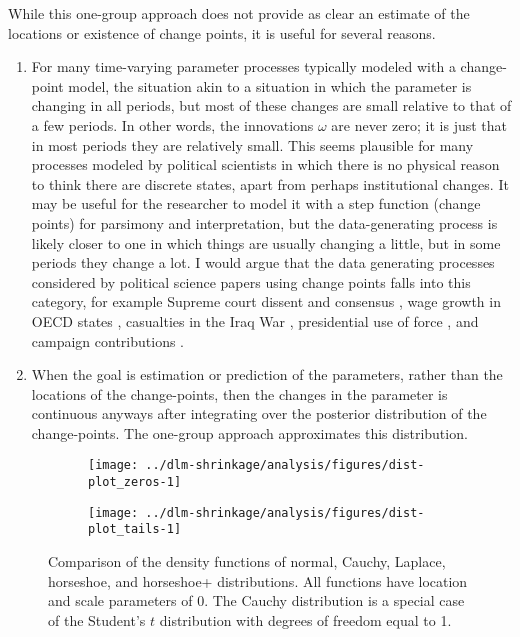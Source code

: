 While this one-group approach does not provide as clear an estimate of the locations or existence of change points, it is useful for several reasons.
\begin{enumerate}
\item For many time-varying parameter processes typically modeled with a change-point model, the situation akin to a situation in which the parameter is changing in all periods, but most of these changes are small relative to that of a few periods.
  In other words, the innovations $\omega$ are never zero; it is just that in most periods they are relatively small.
  This seems plausible for many processes modeled by political scientists in which there is no physical reason to think there are discrete states, apart from perhaps institutional changes.
  It may be useful for the researcher to model it with a step function (change points) for parsimony and interpretation, but the data-generating process is likely closer to one in which things are usually changing a little, but in some periods they change a lot. 
  I would argue that the data generating processes considered by political science papers using change points falls into this category, for example Supreme court dissent and consensus \parencite{CalderiaZorn1998}, wage growth in OECD states \parencite{WesternKleykamp2004}, casualties in the Iraq War \parencite{Spirling2007a}, presidential use of force \parencite{Park2010}, and campaign contributions \parencite{Blackwell2012}.
\item When the goal is estimation or prediction of the parameters, rather than the locations of the change-points, then the changes in the parameter is continuous anyways after integrating over the posterior distribution of the change-points. 
  The one-group approach approximates this distribution.
\end{enumerate}

\begin{figure}[!htpb]
 \begin{subfigure}[b]{\linewidth}
  \texttt{[image: ../dlm-shrinkage/analysis/figures/dist-plot\_zeros-1]}
 \end{subfigure}
 \begin{subfigure}[b]{\linewidth}
    \texttt{[image: ../dlm-shrinkage/analysis/figures/dist-plot\_tails-1]}
 \end{subfigure}
  \caption{
    Comparison of the density functions of normal, Cauchy, Laplace, horseshoe, and horseshoe+ distributions.
    All functions have location and scale parameters of 0.
    The Cauchy distribution is a special case of the Student's $t$ distribution with degrees of freedom equal to 1.
  }
  \label{dlm:fig:density}
\end{figure}




